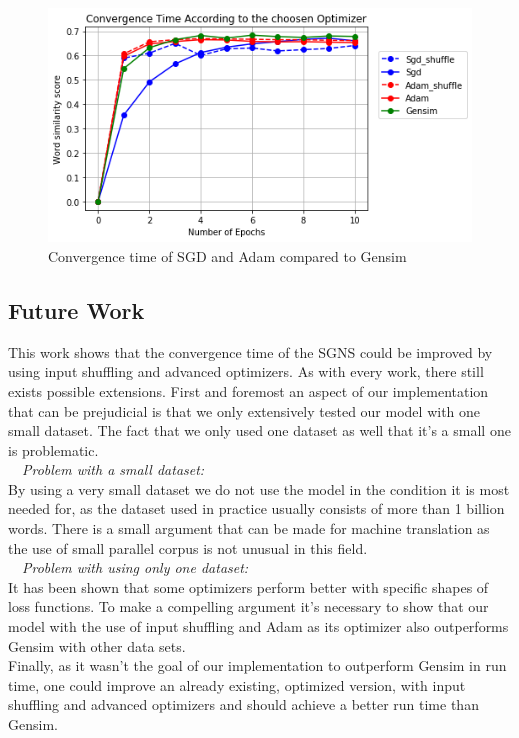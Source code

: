 \begin{figure}[h]
\centering
\includegraphics[scale=0.3]{images/comparison}
\caption{Convergence time of SGD and Adam compared to Gensim}
\label{fig:gensim_vs_adam}
\end{figure}

\subsection{Future Work}
This work shows that the convergence time of the SGNS could be improved by using input shuffling and advanced optimizers. As with every work, there still exists possible extensions. First and foremost an aspect of our implementation that can be prejudicial is that we only extensively tested our model with one small dataset. The fact that we only used one dataset as well that it's a small one is problematic. \\ 
~~\textit{Problem with a small dataset:} \\ By using a very small dataset we do not use the model in the condition it is most needed for, as the dataset used in practice usually consists of more than 1 billion words. There is a small argument that can be made for machine translation as the use of small parallel corpus is not unusual in this field. \\
~~\textit{Problem with using only one dataset:}\\
It has been shown that some optimizers perform better with specific shapes of loss functions. To make a compelling argument it's necessary to show that our model with the use of input shuffling and Adam as its optimizer also outperforms Gensim with other data sets.\\
Finally, as it wasn't the goal of our implementation to outperform Gensim in run time, one could improve an already existing, optimized version, with input shuffling and advanced optimizers and should achieve a better run time than Gensim.